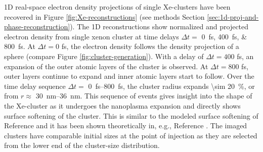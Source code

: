 1D real-space electron density projections of single Xe-clusters have been recovered in Figure \ref{fig:Xe-reconstructions} (see methods Section \ref{sec:1d-proj-and-phase-reconstruction}). The 1D reconstructions show normalized and projected electron density from single xenon cluster at time delays $\Delta t=$ \SIlist{0;400;800}{\femto\second}. At $\Delta t = 0$ fs, the electron density follows the density projection of a sphere (compare Figure \ref{fig:cluster-generation}). With a delay of $\Delta t = 400$ fs, an expansion of the outer atomic layers of the cluster is observed. At $\Delta t = 800$ fs, outer layers continue to expand and inner atomic layers start to follow. Over the time delay sequence $\Delta t=$ \SIrange{0}{800}{\femto\second}, the cluster radius expands \SI{\sim 20}{\percent}, or from $r\approx$ \SIrange{30}{36}{\nano\meter}. This sequence of events gives insight into the shape of the Xe-cluster as it undergoes the nanoplasma expansion and directly shows surface softening of the cluster. This is similar to the modeled surface softening of Reference \cite{Gorkhover-2016-NatPho} and it has been shown theoretically in, e.g., Reference \citep{Hau-Riege-2004-PRE}. The imaged clusters have comparable initial sizes at the point of injection as they are selected from the lower end of the cluster-size distribution.\\[1\baselineskip]
